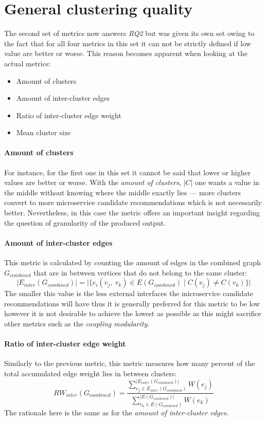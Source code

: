 \documentclass[12pt,a4paper]{report}
\begin{document}
\section{General clustering quality}

The second set of metrics now answers \textit{RQ2} but was given its own set
owing to the fact that for all four metrics in this set it can not be strictly
defined if low value are better or worse. This reason becomes apparent when
looking at the actual metrics:
\begin{itemize}[noitemsep]
  \item Amount of clusters
  \item Amount of inter-cluster edges
  \item Ratio of inter-cluster edge weight
  \item Mean cluster size
\end{itemize}

\paragraph{Amount of clusters}
For instance, for the first one in this set it cannot be said that lower or
higher values are better or worse. With the \textit{amount of clusters},
\(\vert C \vert\) one wants a value in the middle without knowing where
the middle exactly lies --- more clusters convert to more microservice
candidate recommendations which is not necessarily better.
Nevertheless, in this case the metric offers an important insight regarding
the question of granularity of the produced output.

\paragraph{Amount of inter-cluster edges}
This metric is calculated by counting the amount of edges in the combined graph
\(G_{combined}\) that are in between vertices that do not belong to the same cluster:
\[
  \vert E_{inter}(G_{combined}) \vert =
  \vert \{ e_i(v_j, \ v_k) \in E(G_{combined}) \mid C(v_j) \neq C(v_k) \} \vert
\]
The smaller this value is the less external interfaces the microservice candidate
recommendations will have thus it is generally preferred for this metric to be
low however it is not desirable to achieve the lowest as possible as this
might sacrifice other metrics such as the \textit{coupling modularity}.

\paragraph{Ratio of inter-cluster edge weight}
Similarly to the previous metric, this metric measures how many percent
of the total accumulated edge weight lies in between clusters:
\[
  RW_{inter}(G_{combined}) =
  \frac{
    \sum_{e_j \in E_{inter}(G_{combined})}^{\vert E_{inter}(G_{combined}) \vert} W(e_j)
  }{
    \sum_{e_k \in E(G_{combined})}^{\vert E(G_{combined}) \vert} W(e_k)
  }
\]
The rationale here is the same as for the \textit{amount of inter-cluster edges}.
\end{document}
